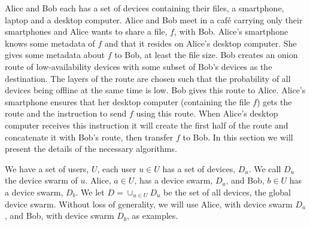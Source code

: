 Alice and Bob each has a set of devices containing their files, \eg a 
smartphone, laptop and a desktop computer.
Alice and Bob meet in a café carrying only their smartphones and Alice wants to 
share a file, \(f\), with Bob.
Alice's smartphone knows some metadata of \(f\) and that it resides on Alice's 
desktop computer.
She gives some metadata about \(f\) to Bob, at least the file size.
Bob creates an onion route of low-availability devices with some subset of Bob's 
devices as the destination.
The layers of the route are chosen such that the probability of all devices 
being offline at the same time is low.
Bob gives this route to Alice.
Alice's smartphone ensures that her desktop computer (containing the file \(f\)) 
gets the route and the instruction to send \(f\) using this route.
When Alice's desktop computer receives this instruction it will create the first 
half of the route and concatenate it with Bob's route, then transfer \(f\) to 
Bob.
In this section we will present the details of the necessary algorithms.

We have a set of users, \(U\), each user \(u\in U\) has a set of devices, 
\(D_u\).
We call \(D_u\) the device swarm of \(u\).
Alice, \(a\in U\), has a device swarm, \(D_a\), and Bob, \(b\in U\) has a device 
swarm, \(D_b\).
We let \(D = \cup_{u\in U} D_u\) be the set of all devices, the global device 
swarm.
Without loss of generality, we will use Alice, with device swarm \(D_a\), and 
Bob, with device swarm \(D_b\), as examples.






